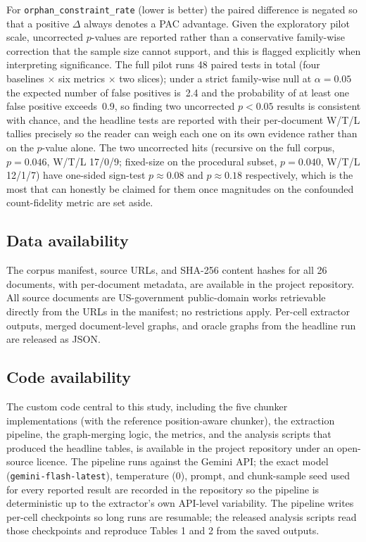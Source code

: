 \documentclass[make,article,submit,oneauthor,pdftex]{Definitions/mdpi}
\begin{document}
For \texttt{orphan\_constraint\_rate} (lower is better) the paired
difference is negated so that a positive $\Delta$ always denotes a PAC
advantage. Given the exploratory pilot scale, uncorrected $p$-values
are reported rather than a conservative family-wise correction that
the sample size cannot support, and this is flagged explicitly when
interpreting significance. The full pilot runs 48 paired tests in
total (four baselines $\times$ six metrics $\times$ two slices); under
a strict family-wise null at $\alpha=0.05$ the expected number of
false positives is~2.4 and the probability of at least one false
positive exceeds~0.9, so finding two uncorrected $p<0.05$ results is
consistent with chance, and the headline tests are reported with
their per-document W/T/L tallies precisely so the reader can weigh
each one on its own evidence rather than on the $p$-value alone. The
two uncorrected hits (recursive on the full corpus, $p=0.046$, W/T/L
17/0/9; fixed-size on the procedural subset, $p=0.040$, W/T/L 12/1/7)
have one-sided sign-test $p\approx0.08$ and $p\approx0.18$
respectively, which is the most that can honestly be claimed for them
once magnitudes on the confounded count-fidelity metric are set
aside.

\subsection{Data availability}

The corpus manifest, source URLs, and SHA-256 content hashes for all 26
documents, with per-document metadata, are available in the project
repository. All source documents are US-government public-domain works
retrievable directly from the URLs in the manifest; no restrictions
apply. Per-cell extractor outputs, merged document-level graphs, and
oracle graphs from the headline run are released as JSON.

\subsection{Code availability}

The custom code central to this study, including the five chunker
implementations (with the reference position-aware chunker), the
extraction pipeline, the graph-merging logic, the metrics, and the
analysis scripts that produced the headline tables, is available in the
project repository under an open-source licence. The pipeline runs
against the Gemini API; the exact model
(\texttt{gemini-flash-latest}), temperature (0), prompt, and
chunk-sample seed used for every reported result are recorded in the
repository so the pipeline is deterministic up to the extractor's own
API-level variability. The pipeline writes per-cell checkpoints so
long runs are resumable; the released analysis scripts read those
checkpoints and reproduce Tables 1 and 2 from the saved outputs.
\end{document}
